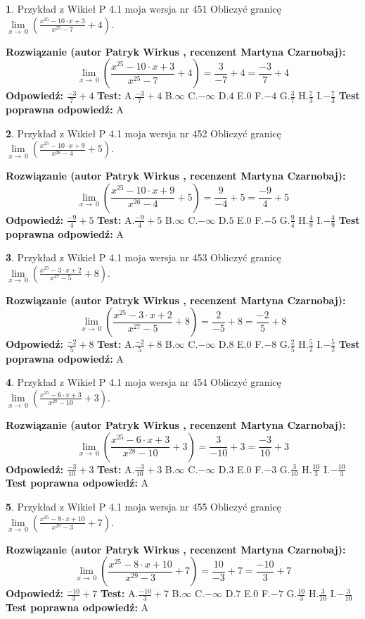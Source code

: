 \documentclass[12pt, a4paper]{article}
\theoremstyle{definition} %
\newtheorem{zad}{}
\newcommand{\zadStart}[1]{\begin{zad}#1\newline}
\newcommand{\zadStop}{\end{zad}}
\newcommand{\rozwStart}[2]{\noindent \textbf{Rozwiązanie (autor #1 , recenzent #2): }\newline}
\newcommand{\rozwStop}{\newline}
\newcommand{\odpStart}{\noindent \textbf{Odpowiedź:}\newline}
\newcommand{\odpStop}{\newline}
\newcommand{\testStart}{\noindent \textbf{Test:}\newline}
\newcommand{\testStop}{\newline}
\newcommand{\kluczStart}{\noindent \textbf{Test poprawna odpowiedź:}\newline}
\newcommand{\kluczStop}{\newline}
\begin{document}
\zadStart{Przykład z Wikieł P 4.1 moja wersja nr 451}
Obliczyć granicę $\lim\limits_{x\to\ 0}(\frac{x^{25}-10 \cdot x +3}{x^{25}-7}+4)$.
\zadStop
\rozwStart{Patryk Wirkus}{Martyna Czarnobaj}
$$\lim\limits_{x\to\ 0}(\frac{x^{25}-10 \cdot x +3}{x^{25}-7}+4)=\frac{3}{-7}+4=\frac{-3}{7}+4$$
\rozwStop
\odpStart
$\frac{-3}{7}+4$
\odpStop
\testStart
A.$\frac{-3}{7}+4$
B.$\infty$
C.$-\infty$
D.$4$
E.$0$
F.$-4$
G.$\frac{3}{7}$
H.$\frac{7}{3}$
I.$-\frac{7}{3}$
\testStop
\kluczStart
A
\kluczStop



\zadStart{Przykład z Wikieł P 4.1 moja wersja nr 452}
Obliczyć granicę $\lim\limits_{x\to\ 0}(\frac{x^{25}-10 \cdot x +9}{x^{26}-4}+5)$.
\zadStop
\rozwStart{Patryk Wirkus}{Martyna Czarnobaj}
$$\lim\limits_{x\to\ 0}(\frac{x^{25}-10 \cdot x +9}{x^{26}-4}+5)=\frac{9}{-4}+5=\frac{-9}{4}+5$$
\rozwStop
\odpStart
$\frac{-9}{4}+5$
\odpStop
\testStart
A.$\frac{-9}{4}+5$
B.$\infty$
C.$-\infty$
D.$5$
E.$0$
F.$-5$
G.$\frac{9}{4}$
H.$\frac{4}{9}$
I.$-\frac{4}{9}$
\testStop
\kluczStart
A
\kluczStop



\zadStart{Przykład z Wikieł P 4.1 moja wersja nr 453}
Obliczyć granicę $\lim\limits_{x\to\ 0}(\frac{x^{25}-3 \cdot x +2}{x^{27}-5}+8)$.
\zadStop
\rozwStart{Patryk Wirkus}{Martyna Czarnobaj}
$$\lim\limits_{x\to\ 0}(\frac{x^{25}-3 \cdot x +2}{x^{27}-5}+8)=\frac{2}{-5}+8=\frac{-2}{5}+8$$
\rozwStop
\odpStart
$\frac{-2}{5}+8$
\odpStop
\testStart
A.$\frac{-2}{5}+8$
B.$\infty$
C.$-\infty$
D.$8$
E.$0$
F.$-8$
G.$\frac{2}{5}$
H.$\frac{5}{2}$
I.$-\frac{5}{2}$
\testStop
\kluczStart
A
\kluczStop



\zadStart{Przykład z Wikieł P 4.1 moja wersja nr 454}
Obliczyć granicę $\lim\limits_{x\to\ 0}(\frac{x^{25}-6 \cdot x +3}{x^{28}-10}+3)$.
\zadStop
\rozwStart{Patryk Wirkus}{Martyna Czarnobaj}
$$\lim\limits_{x\to\ 0}(\frac{x^{25}-6 \cdot x +3}{x^{28}-10}+3)=\frac{3}{-10}+3=\frac{-3}{10}+3$$
\rozwStop
\odpStart
$\frac{-3}{10}+3$
\odpStop
\testStart
A.$\frac{-3}{10}+3$
B.$\infty$
C.$-\infty$
D.$3$
E.$0$
F.$-3$
G.$\frac{3}{10}$
H.$\frac{10}{3}$
I.$-\frac{10}{3}$
\testStop
\kluczStart
A
\kluczStop



\zadStart{Przykład z Wikieł P 4.1 moja wersja nr 455}
Obliczyć granicę $\lim\limits_{x\to\ 0}(\frac{x^{25}-8 \cdot x +10}{x^{29}-3}+7)$.
\zadStop
\rozwStart{Patryk Wirkus}{Martyna Czarnobaj}
$$\lim\limits_{x\to\ 0}(\frac{x^{25}-8 \cdot x +10}{x^{29}-3}+7)=\frac{10}{-3}+7=\frac{-10}{3}+7$$
\rozwStop
\odpStart
$\frac{-10}{3}+7$
\odpStop
\testStart
A.$\frac{-10}{3}+7$
B.$\infty$
C.$-\infty$
D.$7$
E.$0$
F.$-7$
G.$\frac{10}{3}$
H.$\frac{3}{10}$
I.$-\frac{3}{10}$
\testStop
\kluczStart
A
\kluczStop
\end{document}
